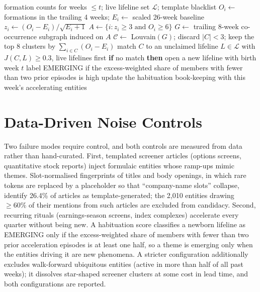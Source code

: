 \documentclass[a4paper,12pt]{report}
\begin{document}
\begin{algorithm}[ht]
\caption{One week of the walk-forward theme detector. At week $t$ every
quantity is computed from history $\leq t$ only; lifeline updates happen
after matching, preserving point-in-time discipline.}
\label{alg:detector}
\begin{algorithmic}[1]
\Require formation counts for weeks $\leq t$; live lifeline set
$\mathcal{L}$; template blacklist
  \State $O_i \gets$ formations in the trailing 4 weeks;
  $E_i \gets$ scaled 26-week baseline
  \State $z_i \gets (O_i - E_i)/\sqrt{E_i + 1}$
\EndFor
\State $A \gets \{i : z_i \geq 3 \text{ and } O_i \geq 6\}$
\State $G \gets$ trailing 8-week co-occurrence subgraph induced on $A$
\State $\mathcal{C} \gets$ Louvain$(G)$; discard $|C| < 3$; keep the top 8
clusters by $\sum_{i \in C}(O_i - E_i)$
  \State match $C$ to an unclaimed lifeline $L \in \mathcal{L}$ with
  $J(C, L) \geq 0.3$, live lifelines first
  \State \textbf{if} no match \textbf{then} open a new lifeline with birth
  week $t$
  \State label EMERGING if the excess-weighted share of members with fewer
  than two prior episodes is high
\EndFor
\State update the habituation book-keeping with this week's accelerating
entities 
\end{algorithmic}
\end{algorithm}

\section{Data-Driven Noise Controls}
\label{sec:noisecontrols}
Two failure modes require control, and both controls are measured from data
rather than hand-curated. First, templated screener articles (options
screens, quantitative stock reports) inject formulaic entities whose ramp-ups
mimic themes. Slot-normalised fingerprints of titles and body openings, in which rare
tokens are replaced by a placeholder so that ``company-name slots'' collapse,
identify 26.4\% of articles as template-generated; the 2{,}010 entities
drawing $\geq 60\%$ of their mentions from such articles are excluded from
candidacy. Second, recurring rituals (earnings-season screens, index
complexes) accelerate every quarter without being new. A habituation
score classifies a newborn lifeline as EMERGING only if the excess-weighted
share of members with fewer than two prior acceleration episodes is at least
one half, so a theme is emerging only when the entities driving it are new
phenomena. A stricter configuration additionally excludes walk-forward
ubiquitous entities (active in more than half of all past weeks); it
dissolves star-shaped screener clusters at some cost in lead time, and both
configurations are reported.
\end{document}
